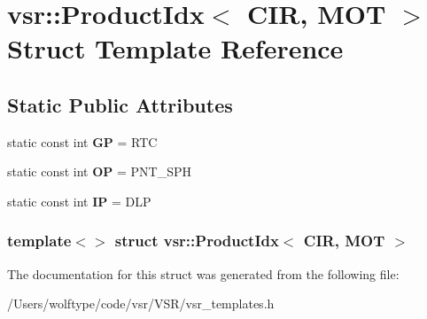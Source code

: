 \hypertarget{structvsr_1_1_product_idx_3_01_c_i_r_00_01_m_o_t_01_4}{\section{vsr\-:\-:Product\-Idx$<$ C\-I\-R, M\-O\-T $>$ Struct Template Reference}
\label{structvsr_1_1_product_idx_3_01_c_i_r_00_01_m_o_t_01_4}
}
\subsection*{Static Public Attributes}
\begin{DoxyCompactItemize}
\item 
\hypertarget{structvsr_1_1_product_idx_3_01_c_i_r_00_01_m_o_t_01_4_ad6c2a46c091454b814cdbd0db60730cf}{static const int {\bfseries G\-P} = R\-T\-C}\label{structvsr_1_1_product_idx_3_01_c_i_r_00_01_m_o_t_01_4_ad6c2a46c091454b814cdbd0db60730cf}

\item 
\hypertarget{structvsr_1_1_product_idx_3_01_c_i_r_00_01_m_o_t_01_4_a0aca128ee3f1b7ec1724e78b295e4234}{static const int {\bfseries O\-P} = P\-N\-T\-\_\-\-S\-P\-H}\label{structvsr_1_1_product_idx_3_01_c_i_r_00_01_m_o_t_01_4_a0aca128ee3f1b7ec1724e78b295e4234}

\item 
\hypertarget{structvsr_1_1_product_idx_3_01_c_i_r_00_01_m_o_t_01_4_ad3d6ebebfe1fcfa907cb0fb49c7ee367}{static const int {\bfseries I\-P} = D\-L\-P}\label{structvsr_1_1_product_idx_3_01_c_i_r_00_01_m_o_t_01_4_ad3d6ebebfe1fcfa907cb0fb49c7ee367}

\end{DoxyCompactItemize}
\subsubsection*{template$<$$>$ struct vsr\-::\-Product\-Idx$<$ C\-I\-R, M\-O\-T $>$}



The documentation for this struct was generated from the following file\-:\begin{DoxyCompactItemize}
\item 
/\-Users/wolftype/code/vsr/\-V\-S\-R/vsr\-\_\-templates.\-h\end{DoxyCompactItemize}
